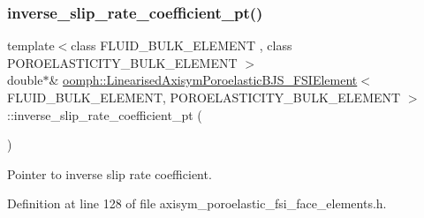 \subsubsection{\texorpdfstring{inverse\+\_\+slip\+\_\+rate\+\_\+coefficient\+\_\+pt()}{inverse\_slip\_rate\_coefficient\_pt()}}
{\footnotesize\ttfamily template$<$class F\+L\+U\+I\+D\+\_\+\+B\+U\+L\+K\+\_\+\+E\+L\+E\+M\+E\+NT , class P\+O\+R\+O\+E\+L\+A\+S\+T\+I\+C\+I\+T\+Y\+\_\+\+B\+U\+L\+K\+\_\+\+E\+L\+E\+M\+E\+NT $>$ \\
double$\ast$\& \hyperlink{classoomph_1_1LinearisedAxisymPoroelasticBJS__FSIElement}{oomph\+::\+Linearised\+Axisym\+Poroelastic\+B\+J\+S\+\_\+\+F\+S\+I\+Element}$<$ F\+L\+U\+I\+D\+\_\+\+B\+U\+L\+K\+\_\+\+E\+L\+E\+M\+E\+NT, P\+O\+R\+O\+E\+L\+A\+S\+T\+I\+C\+I\+T\+Y\+\_\+\+B\+U\+L\+K\+\_\+\+E\+L\+E\+M\+E\+NT $>$\+::inverse\+\_\+slip\+\_\+rate\+\_\+coefficient\+\_\+pt (\begin{DoxyParamCaption}{ }\end{DoxyParamCaption})\hspace{0.3cm}{\ttfamily [inline]}}



Pointer to inverse slip rate coefficient. 



Definition at line 128 of file axisym\+\_\+poroelastic\+\_\+fsi\+\_\+face\+\_\+elements.\+h.

\mbox{\label{classoomph_1_1LinearisedAxisymPoroelasticBJS__FSIElement_a75df9eb4df42e96214d48a721d3eea90}} 
